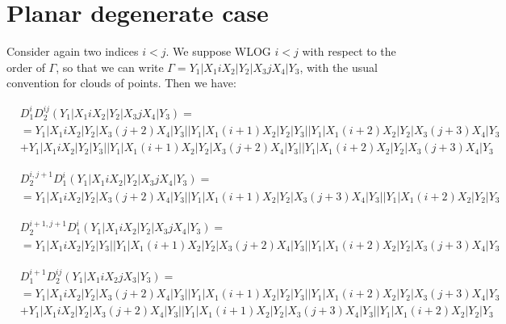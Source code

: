 \documentclass{article}[12pt]
\begin{document}
\section*{Planar degenerate case}
 Consider again two indices $i<j$. We suppose WLOG $i <j$ with respect to the order of $\Gamma$, so that we can write $\Gamma = Y_1|X_1iX_2|Y_2|X_3jX_4|Y_3$, with the usual convention for clouds of points. Then we have:

\begin{align*}
& D_1^iD_2^{ij}(Y_1|X_1iX_2|Y_2|X_3jX_4|Y_3) =\\
&=Y_1| X_1iX_2|Y_2|X_3(j+2)X_4|Y_3|| Y_1| X_1(i+1) X_2|Y_2|Y_3 || Y_1|X_1(i+2)X_2|Y_2|X_3(j+3)X_4|Y_3 \\
& +Y_1| X_1iX_2|Y_2|Y_3 || Y_1| X_1(i+1)X_2|Y_2|X_3(j+2)X_4|Y_3|| Y_1|X_1(i+2)X_2|Y_2|X_3(j+3)X_4|Y_3
\end{align*}

\begin{align*}
& D_2^{i,j+1}D_1^i(Y_1|X_1iX_2|Y_2|X_3jX_4|Y_3) = \\
& =Y_1|X_1iX_2|Y_2|X_3(j+2)X_4|Y_3 ||Y_1|X_1(i+1)X_2|Y_2|X_3(j+3)X_4|Y_3||Y_1|X_1(i+2)X_2|Y_2|Y_3
\end{align*}

\begin{align*}
& D_2^{i+1,j+1}D_1^i(Y_1|X_1iX_2|Y_2|X_3jX_4|Y_3) =\\
& =Y_1|X_1iX_2|Y_2|Y_3|| Y_1|X_1(i+1)X_2|Y_2|X_3(j+2)X_4|Y_3 ||Y_1|X_1(i+2)X_2|Y_2|X_3(j+3)X_4|Y_3
\end{align*}

\begin{align*}
& D_1^{i+1}D_2^{ij}(Y_1|X_1iX_2jX_3|Y_3) =\\
& = Y_1| X_1iX_2|Y_2|X_3(j+2)X_4|Y_3|| Y_1| X_1(i+1) X_2|Y_2|Y_3 || Y_1|X_1(i+2)X_2|Y_2|X_3(j+3)X_4|Y_3\\
& + Y_1|X_1iX_2|Y_2|X_3(j+2)X_4|Y_3 ||Y_1|X_1(i+1)X_2|Y_2|X_3(j+3)X_4|Y_3||Y_1|X_1(i+2)X_2|Y_2|Y_3
\end{align*}
\end{document}

